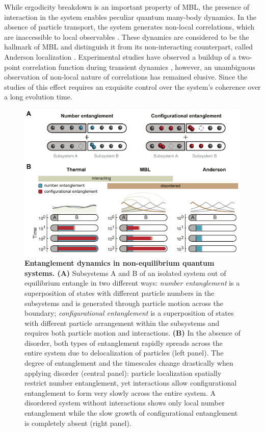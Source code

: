 While ergodicity breakdown is an important property of MBL, the presence of interaction in the system enables peculiar quantum many-body dynamics. In the absence of particle transport, the system generates non-local correlations\cite{Znidaric2008, Bardarson2012}, which are inaccessible to local observables \cite{Serbyn2013, Serbyn2013a, Huse2014}. These dynamics are considered to be the hallmark of MBL and distinguish it from its non-interacting counterpart, called Anderson localization \cite{Anderson1958, Schwartz2007, Billy2008, Roati2008, Lahini2008, Kondov2011, Jendrzejewski2012, Semeghini2015}. Experimental studies have observed a buildup of a two-point correlation function during transient dynamics \cite{Smith2015}, however, an unambiguous observation of non-local nature of correlations has remained elusive. Since the studies of this effect requires an exquisite control over the system's coherence over a long evolution time.

\begin{figure}[t]
	\centering
	\includegraphics{figures/MBL_entropies.pdf}
	\caption{{\bf Entanglement dynamics in non-equilibrium quantum systems. (A)} Subsystems A and B of an isolated system out of equilibrium entangle in two different ways: \textit{number entanglement} is a superposition of states with different particle numbers in the subsystems and is generated through particle motion across the boundary; \textit{configurational entanglement} is a superposition of states with different particle arrangement within the subsystems and requires both particle motion and interactions. \textbf{(B)} In the absence of disorder, both types of entanglement rapidly spreads across the entire system due to delocalization of particles (left panel). The degree of entanglement and the timescales change drastically when applying disorder (central panel): particle localization spatially restrict number entanglement, yet interactions allow configurational entanglement to form very slowly across the entire system. A disordered system without interactions shows only local number entanglement while the slow growth of configurational entanglement is completely absent (right panel).}
	\label{fig:MBL_schematics}
\end{figure}

